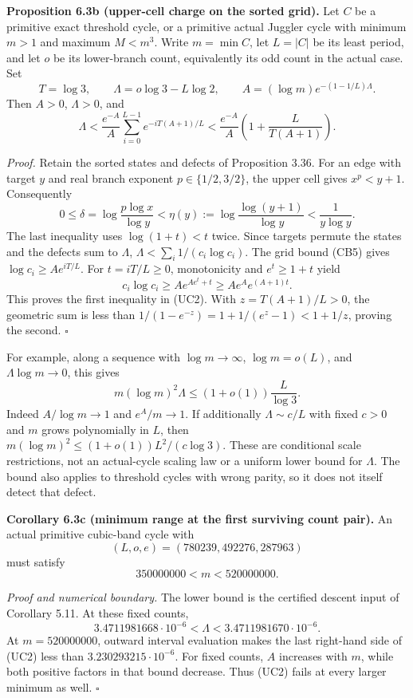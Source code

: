 \documentclass[12pt]{article}
\begin{document}
\textbf{Proposition 6.3b (upper-cell charge on the sorted grid).} Let
\(C\) be a primitive exact threshold cycle, or a primitive actual
Juggler cycle with minimum \(m>1\) and maximum \(M<m^3\). Write
\(m=\min C\), let \(L=|C|\) be its least period, and let \(o\) be its
lower-branch count, equivalently its odd count in the actual case. Set
\[
T=\log3,\qquad \Lambda=o\log3-L\log2,
\qquad A=(\log m)e^{-(1-1/L)\Lambda}.
\] Then \(A>0\), \(\Lambda>0\), and \[
\Lambda<\frac{e^{-A}}A
 \sum_{i=0}^{L-1}e^{-iT(A+1)/L}
<\frac{e^{-A}}A\left(1+\frac{L}{T(A+1)}\right).
\tag{UC2}
\]

\emph{Proof.} Retain the sorted states and defects of Proposition 3.36.
For an edge with target \(y\) and real branch exponent
\(p\in\{1/2,3/2\}\), the upper cell gives \(x^p<y+1\). Consequently \[
0\le\delta=\log\frac{p\log x}{\log y}
<\eta(y):=\log\frac{\log(y+1)}{\log y}
<\frac1{y\log y}.
\] The last inequality uses \(\log(1+t)<t\) twice. Since targets permute
the states and the defects sum to \(\Lambda\),
\(\Lambda<\sum_i1/(c_i\log c_i)\). The grid bound (CB5) gives
\(\log c_i\ge A e^{iT/L}\). For \(t=iT/L\ge0\), monotonicity and
\(e^t\ge1+t\) yield \[
c_i\log c_i\ge A e^{Ae^t+t}
\ge A e^A e^{(A+1)t}.
\] This proves the first inequality in (UC2). With \(z=T(A+1)/L>0\), the
geometric sum is less than \(1/(1-e^{-z})=1+1/(e^z-1)<1+1/z\), proving
the second. \(\square\)

For example, along a sequence with \(\log m\to\infty\), \(\log m=o(L)\),
and \(\Lambda\log m\to0\), this gives \[
m(\log m)^2\Lambda\le(1+o(1))\frac L{\log3}.
\tag{UC3}
\] Indeed \(A/\log m\to1\) and \(e^A/m\to1\). If additionally
\(\Lambda\sim c/L\) with fixed \(c>0\) and \(m\) grows polynomially in
\(L\), then \(m(\log m)^2\le(1+o(1))L^2/(c\log3)\). These are
conditional scale restrictions, not an actual-cycle scaling law or a
uniform lower bound for \(\Lambda\). The bound also applies to threshold
cycles with wrong parity, so it does not itself detect that defect.

\textbf{Corollary 6.3c (minimum range at the first surviving count
pair).} An actual primitive cubic-band cycle with \[
(L,o,e)=(780239,492276,287963)
\] must satisfy \[
350000000<m<520000000.
\tag{UC4}
\]

\emph{Proof and numerical boundary.} The lower bound is the certified
descent input of Corollary 5.11. At these fixed counts, \[
3.4711981668\cdot10^{-6}<\Lambda
<3.4711981670\cdot10^{-6}.
\] At \(m=520000000\), outward interval evaluation makes the last
right-hand side of (UC2) less than \(3.230293215\cdot10^{-6}\). For
fixed counts, \(A\) increases with \(m\), while both positive factors in
that bound decrease. Thus (UC2) fails at every larger minimum as well.
\(\square\)
\end{document}
